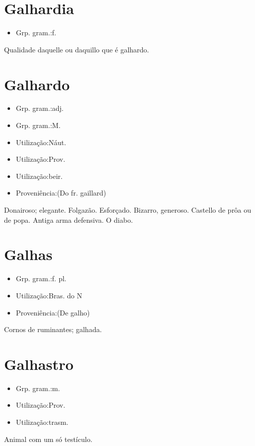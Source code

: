 \section{Galhardia}
\begin{itemize}
\item {Grp. gram.:f.}
\end{itemize}
Qualidade daquelle ou daquillo que é galhardo.
\section{Galhardo}
\begin{itemize}
\item {Grp. gram.:adj.}
\end{itemize}
\begin{itemize}
\item {Grp. gram.:M.}
\end{itemize}
\begin{itemize}
\item {Utilização:Náut.}
\end{itemize}
\begin{itemize}
\item {Utilização:Prov.}
\end{itemize}
\begin{itemize}
\item {Utilização:beir.}
\end{itemize}
\begin{itemize}
\item {Proveniência:(Do fr. \textunderscore gaillard\textunderscore )}
\end{itemize}
Donairoso; elegante.
Folgazão.
Esforçado.
Bizarro, generoso.
Castello de prôa ou de popa.
Antiga arma defensiva.
O diabo.
\section{Galhas}
\begin{itemize}
\item {Grp. gram.:f. pl.}
\end{itemize}
\begin{itemize}
\item {Utilização:Bras. do N}
\end{itemize}
\begin{itemize}
\item {Proveniência:(De \textunderscore galho\textunderscore )}
\end{itemize}
Cornos de ruminantes; galhada.
\section{Galhastro}
\begin{itemize}
\item {Grp. gram.:m.}
\end{itemize}
\begin{itemize}
\item {Utilização:Prov.}
\end{itemize}
\begin{itemize}
\item {Utilização:trasm.}
\end{itemize}
Animal com um só testículo.
